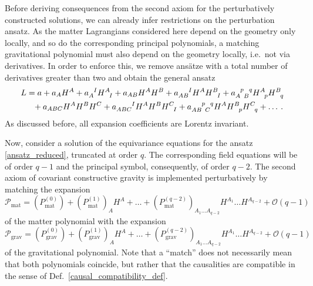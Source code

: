 Before deriving consequences from the second axiom for the perturbatively constructed solutions, we can already infer restrictions on the perturbation ansatz. As the matter Lagrangians considered here depend on the geometry only locally, and so do the corresponding principal polynomials, a matching gravitational polynomial must also depend on the geometry locally, i.e.\ not via derivatives. In order to enforce this, we remove ansätze with a total number of derivatives greater than two and obtain the general ansatz
\begin{equation}\label{ansatz_reduced}
  \begin{aligned}
    L &{} = a + a_A H^A + a_A^{\hphantom AI} H^A_{\hphantom AI} + a_{AB} H^A H^B + a_{AB}^{\hphantom{AB}I} H^A H^B_{\hphantom BI} + a_{A\hphantom pB}^{\hphantom Ap\hphantom Bq} H^A_{\hphantom Ap} H^B_{\hphantom Bq} \\
      &{} \hphantom{=} + a_{ABC} H^A H^B H^C + a_{ABC}^{\hphantom{ABC}I} H^A H^B H^C_{\hphantom CI} + a_{AB\hphantom pC}^{\hphantom{AB}p\hphantom Cq} H^A H^B_{\hphantom Bp} H^C_{\hphantom Cq} + \dots \hspace{2pt}.
  \end{aligned}
\end{equation}
As discussed before, all expansion coefficients are Lorentz invariant.

Now, consider a solution of the equivariance equations for the ansatz \eqref{ansatz_reduced}, truncated at order $q$. The corresponding field equations will be of order $q-1$ and the principal symbol, consequently, of order $q-2$. The second axiom of covariant constructive gravity is implemented perturbatively by matching the expansion
\begin{equation}\label{expansion_matter_poly}
  \mathcal P_\text{mat} = (P^{(0)}_\text{mat}) + (P^{(1)}_\text{mat})_A H^A + \dots + (P^{(q-2)}_\text{mat})_{A_1\dots A_{q-2}} H^{A_1} \dots H^{A_{q-2}} + \mathcal O(q-1)
\end{equation}
of the matter polynomial with the expansion
\begin{equation}\label{expansion_grav_poly}
  \mathcal P_\text{grav} = (P^{(0)}_\text{grav}) + (P^{(1)}_\text{grav})_A H^A + \dots + (P^{(q-2)}_\text{grav})_{A_1\dots A_{q-2}} H^{A_1} \dots H^{A_{q-2}} + \mathcal O(q-1)
\end{equation}
of the gravitational polynomial. Note that a ``match'' does not necessarily mean that both polynomials coincide, but rather that the causalities are compatible in the sense of Def.~\ref{causal_compatibility_def}.

